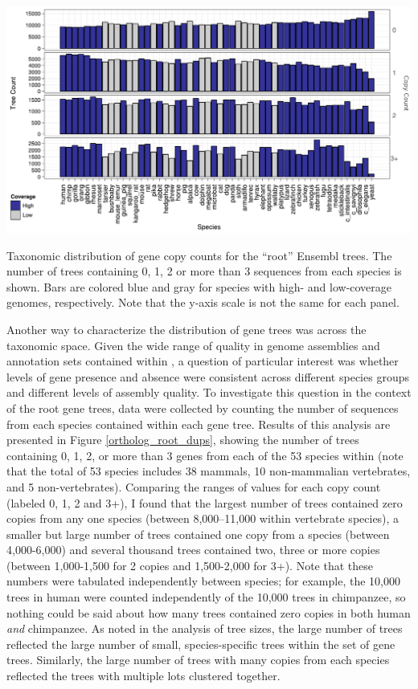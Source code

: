 \bbfig
\centering
\includegraphics[scale=0.83]{Figs/dups_ens_roots.pdf}
\caption{Taxonomic distribution of gene copy counts for the ``root''
  Ensembl trees. The number of trees containing 0, 1, 2 or more than 3
  sequences from each species is shown. Bars are colored blue and gray
  for species with high- and low-coverage genomes, respectively. Note
  that the y-axis scale is not the same for each panel.}
\label{ortholog_root_dups}
\eefig

Another way to characterize the distribution of \cmp gene trees was
across the taxonomic space. Given the wide range of quality in genome
assemblies and annotation sets contained within \ens, a question of
particular interest was whether levels of gene presence and absence
were consistent across different species groups and different levels
of assembly quality. To investigate this question in the context of
the root \cmp gene trees, data were collected by counting the number
of sequences from each species contained within each gene
tree. Results of this analysis are presented in Figure
\ref{ortholog_root_dups}, showing the number of trees containing 0, 1,
2, or more than 3 genes from each of the 53 species within \ens (note
that the total of 53 species includes 38 mammals, 10 non-mammalian
vertebrates, and 5 non-vertebrates). Comparing the ranges of values
for each copy count (labeled 0, 1, 2 and 3+), I found that the largest
number of trees contained zero copies from any one species (between
8,000--11,000 within vertebrate species), a smaller but large number
of trees contained one copy from a species (between 4,000-6,000) and
several thousand trees contained two, three or more copies (between
1,000-1,500 for 2 copies and 1,500-2,000 for 3+). Note that these
numbers were tabulated independently between species; for example, the
10,000 \zcop trees in human were counted independently of the 10,000
\zcop trees in chimpanzee, so nothing could be said about how many
trees contained zero copies in both human \emph{and} chimpanzee. As
noted in the analysis of tree sizes, the large number of \zcop trees
reflected the large number of small, species-specific trees within the
set of \cmp gene trees. Similarly, the large number of trees with many
copies from each species reflected the trees with multiple \mammln
\acp{lot} clustered together.


